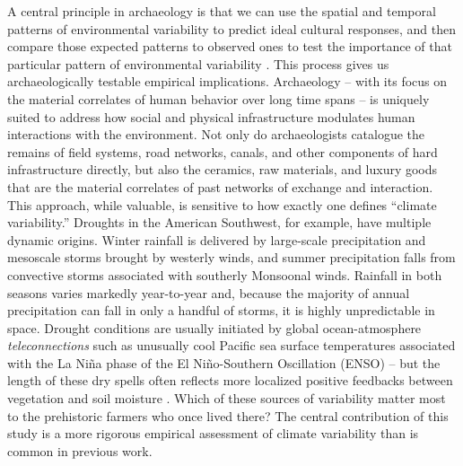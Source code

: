 \documentclass[fleqn,10pt]{wlscirep}
\begin{document}
A central principle in archaeology is that we can use the spatial and temporal patterns of environmental variability to predict ideal cultural responses, and then compare those expected patterns to observed ones to test the importance of that particular pattern of environmental variability \cite{halstead1989}. This process gives us archaeologically testable empirical implications. Archaeology -- with its focus on the material correlates of human behavior over long time spans -- is uniquely suited to address how social and physical infrastructure modulates human interactions with the environment. Not only do archaeologists catalogue the remains of field systems, road networks, canals, and other components of hard infrastructure directly, but also the ceramics, raw materials, and luxury goods that are the material correlates of past networks of exchange and interaction. This approach, while valuable, is sensitive to how exactly one defines ``climate variability.'' Droughts in the American Southwest, for example, have multiple dynamic origins. Winter rainfall is delivered by large-scale precipitation and mesoscale storms brought by westerly winds, and summer precipitation falls from convective storms associated with southerly Monsoonal winds. Rainfall in both seasons varies markedly year-to-year and, because the majority of annual precipitation can fall in only a handful of storms, it is highly unpredictable in space. Drought conditions are usually initiated by global ocean-atmosphere \textit{teleconnections} such as unusually cool Pacific sea surface temperatures associated with the La Ni\~{n}a phase of the El Ni\~{n}o-Southern Oscillation (ENSO) -- but the length of these dry spells often reflects more localized positive feedbacks between vegetation and soil moisture \cite{Koster2004RegionsPrecipitation,Ault2014AssessingData}. Which of these sources of variability matter most to the prehistoric farmers who once lived there? The central contribution of this study is a more rigorous empirical assessment of climate variability than is common in previous work.
\end{document}
